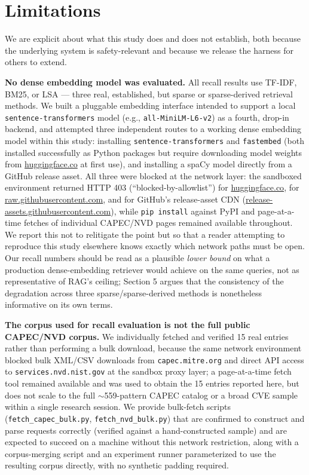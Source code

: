 \documentclass[11pt]{article}
\begin{document}
\section{Limitations}
\label{sec:limitations}

We are explicit about what this study does and does not establish, both because the underlying system is safety-relevant and because we release the harness for others to extend.

\textbf{No dense embedding model was evaluated.} All recall results use TF-IDF, BM25, or LSA --- three real, established, but sparse or sparse-derived retrieval methods. We built a pluggable embedding interface intended to support a local \texttt{sentence-transformers} model (e.g., \texttt{all-MiniLM-L6-v2}) as a fourth, drop-in backend, and attempted three independent routes to a working dense embedding model within this study: installing \texttt{sentence-transformers} and \texttt{fastembed} (both installed successfully as Python packages but require downloading model weights from \url{huggingface.co} at first use), and installing a spaCy model directly from a GitHub release asset. All three were blocked at the network layer: the sandboxed environment returned HTTP 403 (``blocked-by-allowlist'') for \url{huggingface.co}, for \url{raw.githubusercontent.com}, and for GitHub's release-asset CDN (\url{release-assets.githubusercontent.com}), while \texttt{pip install} against PyPI and page-at-a-time fetches of individual CAPEC/NVD pages remained available throughout. We report this not to relitigate the point but so that a reader attempting to reproduce this study elsewhere knows exactly which network paths must be open. Our recall numbers should be read as a plausible \emph{lower bound} on what a production dense-embedding retriever would achieve on the same queries, not as representative of RAG's ceiling; Section 5 argues that the consistency of the degradation across three sparse/sparse-derived methods is nonetheless informative on its own terms.

\textbf{The corpus used for recall evaluation is not the full public CAPEC/NVD corpus.} We individually fetched and verified 15 real entries rather than performing a bulk download, because the same network environment blocked bulk XML/CSV downloads from \texttt{capec.mitre.org} and direct API access to \texttt{services.nvd.nist.gov} at the sandbox proxy layer; a page-at-a-time fetch tool remained available and was used to obtain the 15 entries reported here, but does not scale to the full $\sim$559-pattern CAPEC catalog or a broad CVE sample within a single research session. We provide bulk-fetch scripts (\texttt{fetch\_capec\_bulk.py}, \texttt{fetch\_nvd\_bulk.py}) that are confirmed to construct and parse requests correctly (verified against a hand-constructed sample) and are expected to succeed on a machine without this network restriction, along with a corpus-merging script and an experiment runner parameterized to use the resulting corpus directly, with no synthetic padding required.
\end{document}
